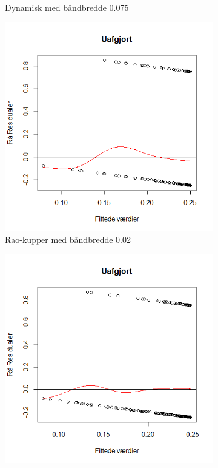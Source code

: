 \documentclass[11pt,a4paper]{article}
\begin{document}
\begin{figure}[h!]
\begin{subfigure}[b]{0.425\linewidth}
    \caption{Dynamisk med båndbredde 0.075}
    \label{fig:ResDUS}
  \end{subfigure}
  \begin{subfigure}[b]{0.425\linewidth}
    \includegraphics[width=\linewidth]{ResSU.png}
    \caption{Rao-kupper med båndbredde 0.02}
    \label{fig:ResSU}
  \end{subfigure}
  \begin{subfigure}[b]{0.425\linewidth}
    \includegraphics[width=\linewidth]{ResDU.png}

\end{subfigure}
\end{figure}
\end{document}
